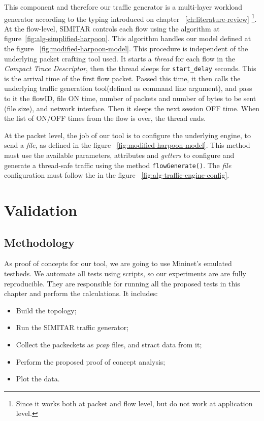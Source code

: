 This component and therefore our traffic generator is a multi-layer workload generator according to the typing introduced on chapter ~\ref{ch:literature-review} \footnote{Since it works both at packet and flow level, but do not work at application level.}. At the flow-level, SIMITAR controls each flow using the algorithm at figure~\ref{fig:alg-simplified-harpoon}. This algorithm handles our model defined at the figure ~\ref{fig:modified-harpoon-model}. This procedure is independent of the underlying packet crafting tool used. It starts a \textit{thread} for each flow in the \textit{Compact Trace Descriptor}, then the thread sleeps for \texttt{start\_delay} seconds. This is the arrival time of the first flow packet. Passed this time, it then calls the underlying traffic generation tool(defined as command line argument), and pass to it the flowID, file ON time, number of packets and number of bytes to be sent (file size), and network interface. Then it sleeps the next session OFF time. When the list of ON/OFF times from the flow is over, the thread ends. 


At the packet level, the job of our tool is to configure the underlying engine, to send a \textit{file}, as defined in the figure ~\ref{fig:modified-harpoon-model}. This method must use the available parameters, attributes and \textit{getters} to configure and generate a thread-safe traffic using the method \texttt{flowGenerate()}. The \textit{file} configuration must follow the in the figure ~\ref{fig:alg-traffic-engine-config}. 
\section{Validation}\label{sec:validation}


\subsection{Methodology}

As proof of concepts for our tool, we are going to use Mininet's emulated testbeds. We automate all tests using scripts, so our experiments are are fully  reproducible. They are responsible for running all the proposed tests in this chapter and perform the calculations. It includes:

\begin{itemize}
	\item Build the topology;
	\item Run the SIMITAR traffic generator;
	\item Collect the packeckets as \textit{pcap} files, and stract data from it;
	\item Perform the proposed proof of concept analysis;
	\item Plot the data.
\end{itemize}


